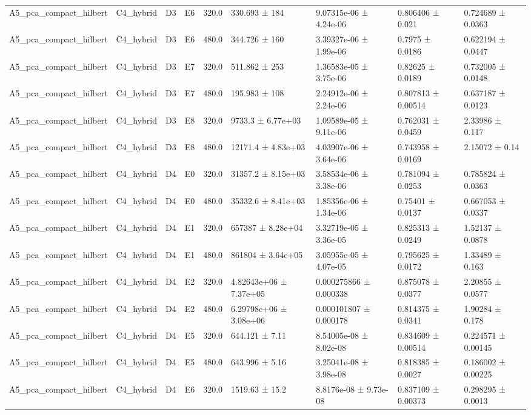 \begin{table}
\begin{tabular}{lllllllll}
A5\_pca\_compact\_hilbert & C4\_hybrid & D3 & E6 & 320.0 & 330.693 ± 184 & 9.07315e-06 ± 4.24e-06 & 0.806406 ± 0.021 & 0.724689 ± 0.0363 \\
A5\_pca\_compact\_hilbert & C4\_hybrid & D3 & E6 & 480.0 & 344.726 ± 160 & 3.39327e-06 ± 1.99e-06 & 0.7975 ± 0.0186 & 0.622194 ± 0.0447 \\
A5\_pca\_compact\_hilbert & C4\_hybrid & D3 & E7 & 320.0 & 511.862 ± 253 & 1.36583e-05 ± 3.75e-06 & 0.82625 ± 0.0189 & 0.732005 ± 0.0148 \\
A5\_pca\_compact\_hilbert & C4\_hybrid & D3 & E7 & 480.0 & 195.983 ± 108 & 2.24912e-06 ± 2.24e-06 & 0.807813 ± 0.00514 & 0.637187 ± 0.0123 \\
A5\_pca\_compact\_hilbert & C4\_hybrid & D3 & E8 & 320.0 & 9733.3 ± 6.77e+03 & 1.09589e-05 ± 9.11e-06 & 0.762031 ± 0.0459 & 2.33986 ± 0.117 \\
A5\_pca\_compact\_hilbert & C4\_hybrid & D3 & E8 & 480.0 & 12171.4 ± 4.83e+03 & 4.03907e-06 ± 3.64e-06 & 0.743958 ± 0.0169 & 2.15072 ± 0.14 \\
A5\_pca\_compact\_hilbert & C4\_hybrid & D4 & E0 & 320.0 & 31357.2 ± 8.15e+03 & 3.58534e-06 ± 3.38e-06 & 0.781094 ± 0.0253 & 0.785824 ± 0.0363 \\
A5\_pca\_compact\_hilbert & C4\_hybrid & D4 & E0 & 480.0 & 35332.6 ± 8.41e+03 & 1.85356e-06 ± 1.34e-06 & 0.75401 ± 0.0137 & 0.667053 ± 0.0337 \\
A5\_pca\_compact\_hilbert & C4\_hybrid & D4 & E1 & 320.0 & 657387 ± 8.28e+04 & 3.32719e-05 ± 3.36e-05 & 0.825313 ± 0.0249 & 1.52137 ± 0.0878 \\
A5\_pca\_compact\_hilbert & C4\_hybrid & D4 & E1 & 480.0 & 861804 ± 3.64e+05 & 3.05955e-05 ± 4.07e-05 & 0.795625 ± 0.0172 & 1.33489 ± 0.163 \\
A5\_pca\_compact\_hilbert & C4\_hybrid & D4 & E2 & 320.0 & 4.82643e+06 ± 7.37e+05 & 0.000275866 ± 0.000338 & 0.875078 ± 0.0377 & 2.20855 ± 0.0577 \\
A5\_pca\_compact\_hilbert & C4\_hybrid & D4 & E2 & 480.0 & 6.29798e+06 ± 3.08e+06 & 0.000101807 ± 0.000178 & 0.814375 ± 0.0341 & 1.90284 ± 0.178 \\
A5\_pca\_compact\_hilbert & C4\_hybrid & D4 & E5 & 320.0 & 644.121 ± 7.11 & 8.54005e-08 ± 8.02e-08 & 0.834609 ± 0.00514 & 0.224571 ± 0.00145 \\
A5\_pca\_compact\_hilbert & C4\_hybrid & D4 & E5 & 480.0 & 643.996 ± 5.16 & 3.25041e-08 ± 3.98e-08 & 0.818385 ± 0.0027 & 0.186002 ± 0.00225 \\
A5\_pca\_compact\_hilbert & C4\_hybrid & D4 & E6 & 320.0 & 1519.63 ± 15.2 & 8.8176e-08 ± 9.73e-08 & 0.837109 ± 0.00373 & 0.298295 ± 0.0013 \\

\end{tabular}
\end{table}
